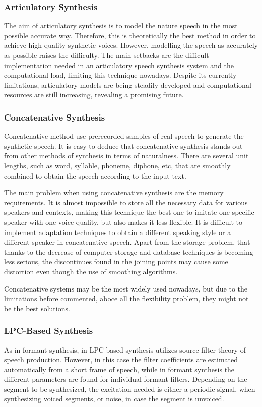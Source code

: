 \subsubsection{Articulatory Synthesis}
\label{articulatory_speech_synthesis}
The aim of articulatory synthesis is to model the nature speech in the most possible accurate way. Therefore, this is theoretically the best method in order to achieve high-quality synthetic voices. However, modelling the speech as accurately as possible raises the difficulty. The main setbacks are the difficult implementation needed in an articulatory speech synthesis system and the computational load, limiting this technique nowadays. Despite its currently limitations, articulatory models are being steadily developed and computational resources are still increasing, revealing a promising future.

\subsubsection{Concatenative Synthesis}
\label{concatenative_speech_synthesis}
Concatenative method use prerecorded samples of real speech to generate the synthetic speech. It is easy to deduce that concatenative synthesis stands out from other methods of synthesis in terms of naturalness. There are several unit lengths, such as word, syllable, phoneme, diphone, etc, that are smoothly combined to obtain the speech according to the input text. 

The main problem when using concatenative synthesis are the memory requirements. It is almost impossible to store all the necessary data for various speakers and contexts, making this technique the best one to imitate one specific speaker with one voice quality, but also makes it less flexible. It is difficult to implement adaptation techniques to obtain a different speaking style or a different speaker in concatenative speech. Apart from the storage problem, that thanks to the decrease of computer storage and database techniques is becoming less serious, the discontinues found in the joining points may cause some distortion even though the use of smoothing algorithms.

Concatenative systems may be the most widely used nowadays, but due to the limitations before commented, aboce all the flexibility problem, they might not be the best solutions.

\subsubsection{LPC-Based Synthesis}
\label{lpc_based_speech_synthesis}
As in formant synthesis, in LPC-based synthesis utilizes source-filter theory of speech production. However, in this case the filter coefficients are estimated automatically from a short frame of speech, while in formant synthesis the different parameters are found for individual formant filters. Depending on the segment to be synthesized, the excitation needed is either a periodic signal, when synthesizing voiced segments, or noise, in case the segment is unvoiced. 


